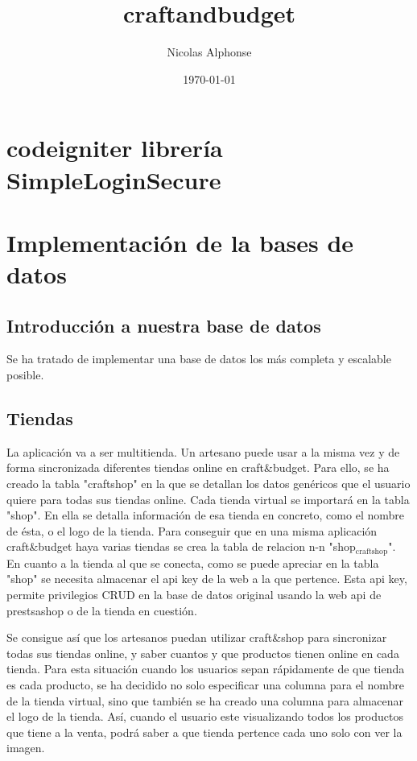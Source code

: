 \documentclass[11pt]{article}
\author{Nicolas Alphonse}
\date{\today}
\title{craftandbudget}
\begin{document}
\maketitle
\tableofcontents

\section{codeigniter librería SimpleLoginSecure}
\label{sec-1}
\section{Implementación de la bases de datos}
\label{sec-2}
\subsection{Introducción a nuestra base de datos}
\label{sec-2-1}
Se ha tratado de implementar una base de datos los más completa y
escalable posible. 
\subsection{Tiendas}
\label{sec-2-2}
La aplicación va a ser multitienda. Un artesano puede usar a la
misma vez y de forma sincronizada diferentes tiendas online en
craft\&budget. Para ello, se ha creado la tabla "craftshop" en la
que se detallan los datos genéricos que el usuario quiere para
todas sus tiendas online. Cada tienda virtual se importará en la
tabla "shop". En ella se detalla información de esa tienda en
concreto, como el nombre de ésta, o el logo de la tienda. Para
conseguir que en una misma aplicación craft\&budget haya varias
tiendas se crea la tabla de relacion n-n "shop$_{\text{craftshop}}$". En
cuanto a la tienda al que se conecta, como se puede apreciar en la
tabla "shop" se necesita almacenar el api key de la web a la que
pertence. Esta api key, permite privilegios CRUD en la base de
datos original usando la web api de prestsashop o de la tienda en
cuestión.

Se consigue así que los artesanos puedan utilizar craft\&shop para
  sincronizar todas sus tiendas online, y saber cuantos y que
  productos tienen online en cada tienda. Para esta situación cuando
  los usuarios sepan rápidamente de que tienda es cada producto, se ha
  decidido no solo especificar una columna para el nombre de la tienda
  virtual, sino que también se ha creado una columna para almacenar el
  logo de la tienda. Así, cuando el usuario este visualizando todos
  los productos que tiene a la venta, podrá saber a que tienda
  pertence cada uno solo con ver la imagen. 
\end{document}
